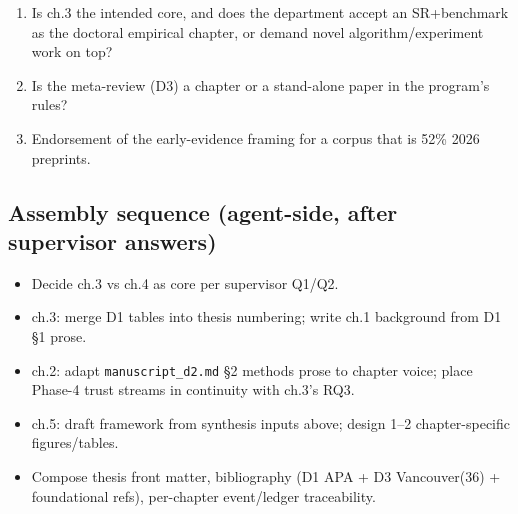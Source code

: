 \documentclass[11pt]{article}
\providecommand{\tightlist}{%
  \setlength{\itemsep}{0pt}\setlength{\parskip}{0pt}}
\begin{document}
\begin{enumerate}
\def\labelenumi{\arabic{enumi}.}
\tightlist
\item
  Is ch.3 the intended core, and does the department accept an
  SR+benchmark as the doctoral empirical chapter, or demand novel
  algorithm/experiment work on top?
\item
  Is the meta-review (D3) a chapter or a stand-alone paper in the
  program's rules?
\item
  Endorsement of the early-evidence framing for a corpus that is 52\%
  2026 preprints.
\end{enumerate}

\subsection{Assembly sequence (agent-side, after supervisor
answers)}\label{assembly-sequence-agent-side-after-supervisor-answers}

\begin{itemize}
\tightlist
\item[$\square$]
  Decide ch.3 vs ch.4 as core per supervisor Q1/Q2.
\item[$\square$]
  ch.3: merge D1 tables into thesis numbering; write ch.1 background
  from D1 §1 prose.
\item[$\square$]
  ch.2: adapt \texttt{manuscript\_d2.md} §2 methods prose to chapter
  voice; place Phase-4 trust streams in continuity with ch.3's RQ3.
\item[$\square$]
  ch.5: draft framework from synthesis inputs above; design 1--2
  chapter-specific figures/tables.
\item[$\square$]
  Compose thesis front matter, bibliography (D1 APA + D3 Vancouver(36) +
  foundational refs), per-chapter event/ledger traceability.
\end{itemize}
\end{document}
